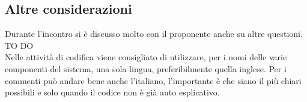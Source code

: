 	\subsection{Altre considerazioni} %
	\label{sub:altre_considerazioni}
	Durante l'incontro si è discusso molto con il proponente anche su altre questioni. \\
	TO DO \\
	Nelle attività di codifica viene consigliato di utilizzare, per i nomi delle varie componenti del sistema, una sola lingua, preferibilmente quella inglese. Per i commenti può andare bene anche l'italiano, l'importante è che siano il più chiari possibili e solo quando il codice non è già auto esplicativo. \\
	
